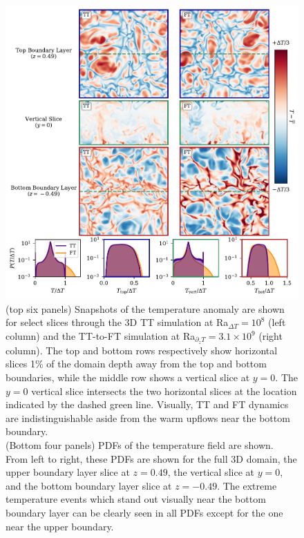 \documentclass[aps, pre, onecolumn, nofootinbib, notitlepage, groupedaddress, amsfonts, amssymb, amsmath, longbibliography, superscriptaddress]{revtex4-1}
\begin{document}
\begin{figure}[p!]
\includegraphics[width=\textwidth]{./figs/rbc_3D_panels.pdf}
\caption{ 
	(top six panels) Snapshots of the temperature anomaly are shown for select slices through the 3D TT simulation at Ra$_{\Delta T} = 10^8$ (left column) and the TT-to-FT simulation at Ra$_{\partial_z T} = 3.1 \times 10^9$ (right column).
	The top and bottom rows respectively show horizontal slices 1\% of the domain depth away from the top and bottom boundaries, while the middle row shows a vertical slice at $y = 0$.
	The $y = 0$ vertical slice intersects the two horizontal slices at the location indicated by the dashed green line.
	Visually, TT and FT dynamics are indistinguishable aside from the warm upflows near the bottom boundary.
	\\
	(Bottom four panels) PDFs of the temperature field are shown.
	From left to right, these PDFs are shown for the full 3D domain, the upper boundary layer slice at $z = 0.49$, the vertical slice at $y = 0$, and the bottom boundary layer slice at $z = -0.49$.
	The extreme temperature events which stand out visually near the bottom boundary layer can be clearly seen in all PDFs except for the one near the upper boundary.
	\label{fig:rbc_3D_panels} }
\end{figure}
\end{document}
